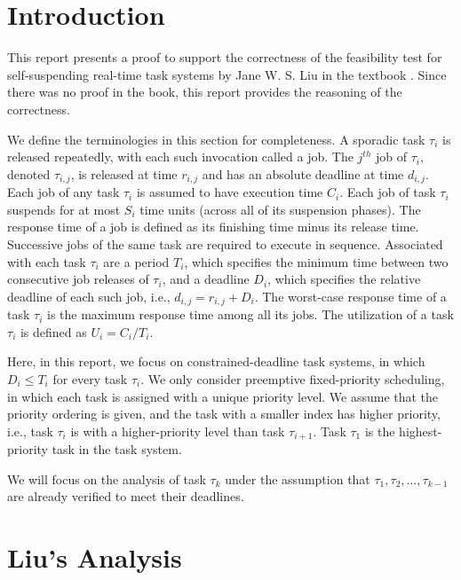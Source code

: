 \section{Introduction}

This report presents a proof to support the correctness of the feasibility test for self-suspending real-time task systems by Jane W. S. Liu in the textbook \cite{Liu:2000:RS:518501}. Since there was no proof in the book, this report provides the reasoning of the correctness.  

We define the
terminologies in this section for completeness.  A sporadic task
$\tau_i$ is released repeatedly, with each such invocation called a
job. The $j^{th}$ job of $\tau_i$, denoted $\tau_{i,j}$, is released
at time $r_{i,j}$ and has an absolute deadline at time $d_{i,j}$. Each
job of any task $\tau_i$ is assumed to have execution time $C_i$. Each job of task $\tau_i$ 
suspends for at most $S_i$ time units (across all of its suspension phases).
The response time
of a job is defined as its finishing time minus its release
time. Successive jobs of the same task are required to execute in
sequence. Associated with each task $\tau_i$ are a period $T_i$, which
specifies the minimum time between two consecutive job releases of
$\tau_i$, and a deadline $D_i$, which specifies the relative deadline
of each such job, i.e., $d_{i,j}=r_{i,j}+D_i$. The worst-case response
time of a task $\tau_i$ is the maximum response time among all its
jobs.  The utilization of a task $\tau_i$ is defined as $U_i=C_i/T_i$.

Here, in this report, we focus on constrained-deadline task systems, in which $D_i \leq T_i$ for every task $\tau_i$. We only consider preemptive fixed-priority scheduling, in which each task is assigned with a unique priority level. We assume that the priority ordering is given, and the task with a smaller index has higher priority, i.e., task $\tau_i$ is with a higher-priority level than task $\tau_{i+1}$. Task $\tau_1$ is the highest-priority task in the task system.

We will focus on the analysis of task $\tau_k$ under the assumption that $\tau_1, \tau_2, \ldots, \tau_{k-1}$ are already verified to meet their deadlines. 

\section{Liu's Analysis}



  
  
  
  
  